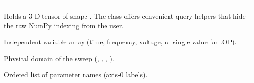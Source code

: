 \documentclass[letterpaper,10pt,english]{sphinxmanual}
\begin{document}
\bigskip\hrule\bigskip


\begin{fulllineitems}
\label{\detokenize{results:SensitivityData}}
\pysigstartsignatures
\pysiglinewithargsret
{}
{\sphinxparamcomma {}\sphinxparamcomma {}\sphinxparamcomma {}}
{}
\pysigstopsignatures
\sphinxAtStartPar
Holds a 3‑D tensor of shape .
The class offers convenient query helpers that hide the raw NumPy indexing from the user.

\begin{fulllineitems}
\label{\detokenize{results:SensitivityData.sweep_axis}}
\pysigstartsignatures
\pysigline
{}
\pysigstopsignatures
\sphinxAtStartPar
{} \textendash{} Independent variable array (time, frequency, voltage, or single value for .OP).

\end{fulllineitems}


\begin{fulllineitems}
\label{\detokenize{results:SensitivityData.domain}}
\pysigstartsignatures
\pysigline
{}
\pysigstopsignatures
\sphinxAtStartPar
Physical domain of the sweep (, , , ).

\end{fulllineitems}


\begin{fulllineitems}
\label{\detokenize{results:SensitivityData.param_names}}
\pysigstartsignatures
\pysigline
{}
\pysigstopsignatures
\sphinxAtStartPar
Ordered list of parameter names (axis‑0 labels).


\end{fulllineitems}
\end{fulllineitems}
\end{document}
